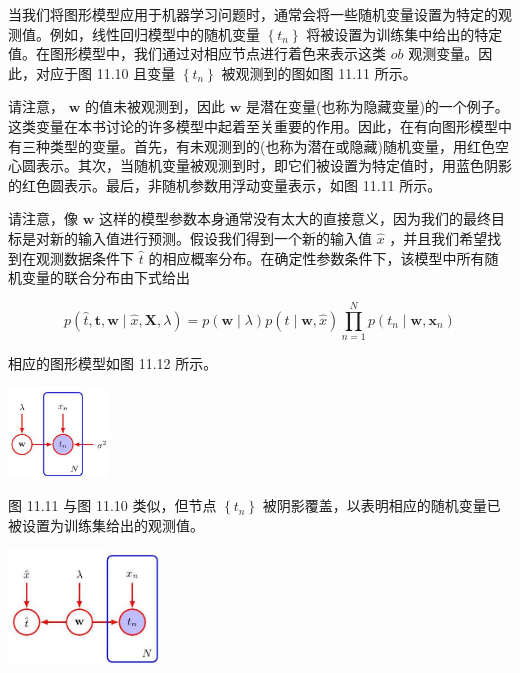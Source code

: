 \documentclass[10pt]{article}
\begin{document}
当我们将图形模型应用于机器学习问题时，通常会将一些随机变量设置为特定的观测值。例如，线性回归模型中的随机变量 \(\left\{  {t}_{n}\right\}\) 将被设置为训练集中给出的特定值。在图形模型中，我们通过对相应节点进行着色来表示这类 \({ob}\) 观测变量。因此，对应于图 11.10 且变量 \(\left\{  {t}_{n}\right\}\) 被观测到的图如图 11.11 所示。

请注意， \(\mathbf{w}\) 的值未被观测到，因此 \(\mathbf{w}\) 是潜在变量(也称为隐藏变量)的一个例子。这类变量在本书讨论的许多模型中起着至关重要的作用。因此，在有向图形模型中有三种类型的变量。首先，有未观测到的(也称为潜在或隐藏)随机变量，用红色空心圆表示。其次，当随机变量被观测到时，即它们被设置为特定值时，用蓝色阴影的红色圆表示。最后，非随机参数用浮动变量表示，如图 11.11 所示。

请注意，像 \(\mathbf{w}\) 这样的模型参数本身通常没有太大的直接意义，因为我们的最终目标是对新的输入值进行预测。假设我们得到一个新的输入值 \(\widehat{x}\) ，并且我们希望找到在观测数据条件下 \(\widehat{t}\) 的相应概率分布。在确定性参数条件下，该模型中所有随机变量的联合分布由下式给出

\[
p\left( {\widehat{t},\mathbf{t},\mathbf{w} \mid  \widehat{x},\mathbf{X},\lambda }\right)  = p\left( {\mathbf{w} \mid  \lambda }\right) p\left( {\widehat{t} \mid  \mathbf{w},\widehat{x}}\right) \mathop{\prod }\limits_{{n = 1}}^{N}p\left( {{t}_{n} \mid  \mathbf{w},{\mathbf{x}}_{n}}\right)  \tag{11.19}
\]

相应的图形模型如图 11.12 所示。

\begin{center}
\includegraphics[max width=0.2\textwidth]{images/0194e279-9b28-703a-88f4-c3ac21e2010d_354_1222_1716_320_287_0.jpg}
\end{center}
\hspace*{3em} 

图 11.11 与图 11.10 类似，但节点 \(\left\{  {t}_{n}\right\}\) 被阴影覆盖，以表明相应的随机变量已被设置为训练集给出的观测值。

\begin{center}
\includegraphics[max width=0.3\textwidth]{images/0194e279-9b28-703a-88f4-c3ac21e2010d_355_1178_345_371_283_0.jpg}
\end{center}
\hspace*{3em} 
\end{document}
